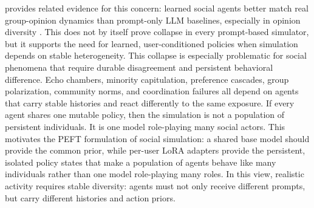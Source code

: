\begin{table}[tbp]
\centering
\footnotesize
\setlength{\tabcolsep}{4pt}
\renewcommand{\arraystretch}{1.20}
\caption{EvoBot reports that learned social agents better match real group-opinion dynamics than prompt-only LLM baselines \citep{kong-etal-2025-enhancing}. Lower bias and diversity difference indicate closer alignment with real data.}
\label{tab:evobot-group-opinion}
\end{table}

 provides related evidence for this concern: learned social agents better match real group-opinion dynamics than prompt-only LLM baselines, especially in opinion diversity \citep{kong-etal-2025-enhancing}. This does not by itself prove collapse in every prompt-based simulator, but it supports the need for learned, user-conditioned policies when simulation depends on stable heterogeneity. This collapse is especially problematic for social phenomena that require durable disagreement and persistent behavioral difference. Echo chambers, minority capitulation, preference cascades, group polarization, community norms, and coordination failures all depend on agents that carry stable histories and react differently to the same exposure. If every agent shares one mutable policy, then the simulation is not a population of persistent individuals. It is one model role-playing many social actors. This motivates the PEFT formulation of social simulation: a shared base model should provide the common prior, while per-user LoRA adapters provide the persistent, isolated policy states that make a population of agents behave like many individuals rather than one model role-playing many roles. In this view, realistic activity requires stable diversity: agents must not only receive different prompts, but carry different histories and action priors.

